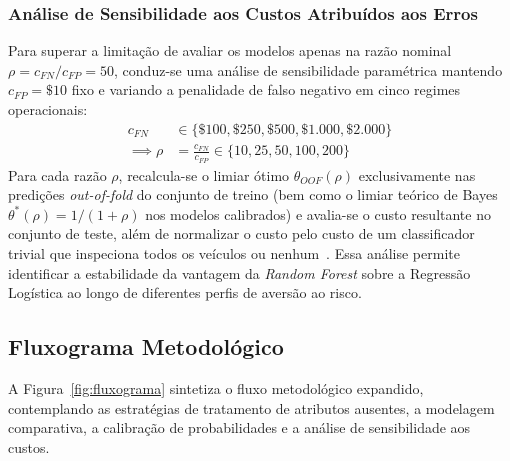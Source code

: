 \documentclass[conference]{IEEEtran}
\begin{document}
\subsubsection{Análise de Sensibilidade aos Custos Atribuídos aos Erros}
Para superar a limitação de avaliar os modelos apenas na razão nominal $\rho = c_{FN}/c_{FP} = 50$, conduz-se uma análise de sensibilidade paramétrica mantendo $c_{FP} = \$10$ fixo e variando a penalidade de falso negativo em cinco regimes operacionais:
\begin{equation}
\begin{aligned}
    c_{FN} &\in \{\$100, \$250, \$500, \$1.000, \$2.000\} \\
    \implies \rho &= \frac{c_{FN}}{c_{FP}} \in \{10, 25, 50, 100, 200\}
\end{aligned}
\end{equation}
Para cada razão $\rho$, recalcula-se o limiar ótimo $\theta_{OOF}(\rho)$ exclusivamente nas predições \textit{out-of-fold} do conjunto de treino (bem como o limiar teórico de Bayes $\theta^*(\rho) = 1/(1+\rho)$ nos modelos calibrados) e avalia-se o custo resultante no conjunto de teste, além de normalizar o custo pelo custo de um classificador trivial que inspeciona todos os veículos ou nenhum~\cite{drummond2006cost,hughes2025xai}. Essa análise permite identificar a estabilidade da vantagem da \textit{Random Forest} sobre a Regressão Logística ao longo de diferentes perfis de aversão ao risco.

\subsection{Fluxograma Metodológico}

A Figura~\ref{fig:fluxograma} sintetiza o fluxo metodológico expandido, contemplando as estratégias de tratamento de atributos ausentes, a modelagem comparativa, a calibração de probabilidades e a análise de sensibilidade aos custos.
\end{document}
